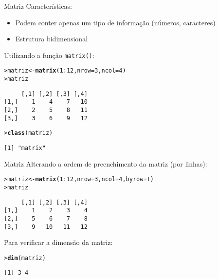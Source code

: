 \documentclass[10pt,handout]{beamer}\usepackage{graphicx, color}
\makeatletter
\newcommand{\hlfunctioncall}[1]{\textcolor[rgb]{0,0,0.545098039215686}{\textbf{#1}}}%
\newenvironment{kframe}{%
 \def\at@end@of@kframe{}%
 \ifinner\ifhmode%
  \def\at@end@of@kframe{\end{minipage}}%
  \begin{minipage}{\columnwidth}%
 \fi\fi%
 \def\FrameCommand##1{\hskip\@totalleftmargin \hskip-\fboxsep
 \colorbox{shadecolor}{##1}\hskip-\fboxsep
     \hskip-\linewidth \hskip-\@totalleftmargin \hskip\columnwidth}%
 \MakeFramed {\advance\hsize-\width
   \@totalleftmargin\z@ \linewidth\hsize
   \@setminipage}}%
 {\par\unskip\endMakeFramed%
 \at@end@of@kframe}
\newenvironment{knitrout}{}{} %
\makeatother
\begin{document}
\begin{frame}[fragile=singleslide]{Matriz}
Características:
\begin{itemize}
\item Podem conter apenas um tipo de informação (números, caracteres)
\item Estrutura bidimensional
\end{itemize}
Utilizando a função \texttt{matrix()}:
\begin{knitrout}\small
{}\color{fgcolor}\begin{kframe}
\begin{alltt}
> matriz <- \hlfunctioncall{matrix}(1:12, nrow=3, ncol=4)
> matriz
\end{alltt}
\begin{verbatim}
     [,1] [,2] [,3] [,4]
[1,]    1    4    7   10
[2,]    2    5    8   11
[3,]    3    6    9   12
\end{verbatim}
\begin{alltt}
> \hlfunctioncall{class}(matriz)
\end{alltt}
\begin{verbatim}
[1] "matrix"
\end{verbatim}
\end{kframe}
\end{knitrout}

\end{frame}

\begin{frame}[fragile=singleslide]{Matriz}
Alterando a ordem de preenchimento da matriz (por linhas):
\begin{knitrout}\small
{}\color{fgcolor}\begin{kframe}
\begin{alltt}
> matriz <- \hlfunctioncall{matrix}(1:12, nrow=3, ncol=4, byrow=T)
> matriz
\end{alltt}
\begin{verbatim}
     [,1] [,2] [,3] [,4]
[1,]    1    2    3    4
[2,]    5    6    7    8
[3,]    9   10   11   12
\end{verbatim}
\end{kframe}
\end{knitrout}

Para verificar a dimensão da matriz:
\begin{knitrout}\small
{}\color{fgcolor}\begin{kframe}
\begin{alltt}
> \hlfunctioncall{dim}(matriz)
\end{alltt}
\begin{verbatim}
[1] 3 4
\end{verbatim}
\end{kframe}
\end{knitrout}

\end{frame}
\end{document}

